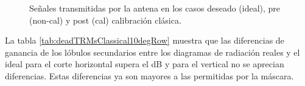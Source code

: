 \begin{figure}[H]
	\centering

	\caption{Señales transmitidas por la antena en los casos deseado (ideal), pre (non-cal) y post (cal) calibración clásica.}
	\label{fig:deadTRMsClassical10degRow}
\end{figure}

La tabla \ref{tab:deadTRMsClassical10degRow} muestra que las diferencias de ganancia de los lóbulos secundarios entre los 
diagramas de radiación reales y el ideal para el corte horizontal supera el dB y para el vertical no se aprecian diferencias. 
Estas diferencias ya son mayores a las permitidas por la máscara.

